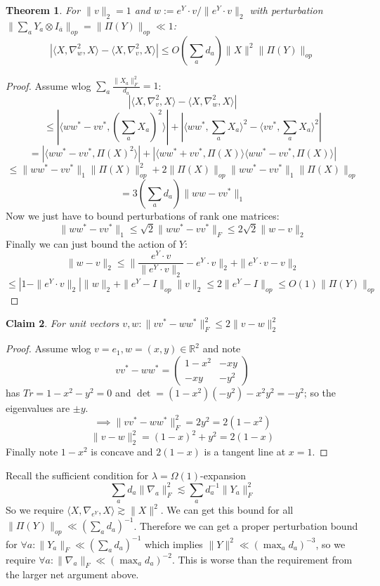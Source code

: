 \documentclass{article}
\newtheorem{theorem}{Theorem}
\newtheorem{claim}[theorem]{Claim}
\newcommand{\R}{{\mathbb{R}}}
\begin{document}
\begin{theorem}
For $\|v\|_{2} = 1$ and $w := e^{Y} \cdot v / \|e^{Y} \cdot v\|_{2}$ with perturbation $\|\sum_{a} Y_{a} \otimes I_{\overline{a}}\|_{op} = \|\Pi(Y)\|_{op} \ll 1$:
\[ |\langle X, \nabla_{w}^{2}, X \rangle - \langle X, \nabla_{v}^{2}, X \rangle| \leq O(\sum_{a} d_{a}) \|X\|^{2} \|\Pi(Y)\|_{op}   \]
\end{theorem}
\begin{proof}
Assume wlog $\sum_{a} \frac{\|X_{a}\|_{F}^{2}}{d_{a}} = 1$:
\[ |\langle X, \nabla_{v}^{2}, X \rangle - \langle X, \nabla_{w}^{2}, X \rangle| \]
\[ \leq |\langle w w^{*} - v v^{*}, \left( \sum_{a} X_{a} \right)^{2} \rangle| + |\langle w w^{*}, \sum_{a} X_{a} \rangle^{2} - \langle v v^{*}, \sum_{a} X_{a} \rangle^{2}| \]
\[ = |\langle w w^{*} - v v^{*}, \Pi(X)^{2} \rangle| + |\langle w w^{*} + v v^{*}, \Pi(X) \rangle \langle w w^{*} - v v^{*}, \Pi(X) \rangle|    \]
\[ \leq \|w w^{*} - v v^{*}\|_{1} \|\Pi(X)\|_{op}^{2} + 2 \|\Pi(X)\|_{op} \|w w^{*} - v v^{*}\|_{1} \|\Pi(X)\|_{op}  \]
\[ = 3 (\sum_{a} d_{a}) \|w w - v v^{*}\|_{1}   \]
Now we just have to bound perturbations of rank one matrices:
\[ \|w w^{*} - v v^{*}\|_{1} \leq \sqrt{2} \|w w^{*} - v v^{*}\|_{F} \leq 2 \sqrt{2} \|w - v\|_{2}  \]
Finally we can just bound the action of $Y$:
\[ \|w - v\|_{2} \leq \|\frac{e^{Y} \cdot v}{\|e^{Y} \cdot v\|_{2}} - e^Y \cdot v\|_{2} + \|e^{Y} \cdot v - v\|_{2}  \]
\[ \leq |1 - \|e^{Y} \cdot v\|_{2}| \|w\|_{2} + \|e^{Y} - I\|_{op} \|v\|_{2} \leq 2 \|e^{Y} - I\|_{op} \leq O(1) \|\Pi(Y)\|_{op} \]
\end{proof}

\begin{claim}
For unit vectors $v,w: \|v v^{*} - w w^{*}\|_{F}^{2} \leq 2 \|v - w\|_{2}^{2}$
\end{claim}
\begin{proof}
Assume wlog $v = e_{1}, w = (x,y) \in \R^{2}$ and note
\[ v v^{*} - w w^{*} = \begin{pmatrix} 1 - x^{2} & -xy \\ -xy & -y^{2} \end{pmatrix}  \]
has $Tr = 1 - x^{2} - y^{2} = 0$ and $\det = (1-x^{2})(-y^{2}) - x^{2} y^{2} = - y^{2}$; so the eigenvalues are $\pm y$.
\[ \implies \|v v^{*} - w w^{*}\|_{F}^{2} = 2 y^{2} = 2(1-x^{2}) \]
\[ \|v - w\|_{2}^{2} = (1-x)^{2} + y^{2} = 2(1-x) \]
Finally note $1 - x^{2}$ is concave and $2(1-x)$ is a tangent line at $x=1$.
\end{proof}

Recall the sufficient condition for $\lambda = \Omega(1)$-expansion
\[ \sum_{a} d_{a} \|\nabla_{a}\|_{F}^{2} \lesssim \sum_{a} d_{a}^{-1} \|Y_{a}\|_{F}^{2}  \]
So we require $\langle X, \nabla_{e^{Y}}, X \rangle \gtrsim \|X\|^{2}$. We can get this bound for all $\|\Pi(Y)\|_{op} \ll (\sum_{a} d_{a})^{-1}$. Therefore we can get a proper perturbation bound for $\forall a: \|Y_{a}\|_{F} \ll (\sum_{a} d_{a})^{-1}$ which implies $\|Y\|^{2} \ll (\max_{a} d_{a})^{-3}$, so we require $\forall a: \|\nabla_{a}\|_{F} \ll (\max_{a} d_{a})^{-2}$. This is worse than the requirement from the larger net argument above.
\end{document}
